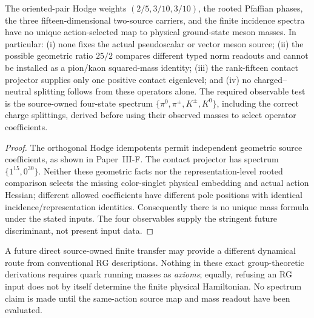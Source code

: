\documentclass[12pt,a4paper]{article}
\begin{document}
\begin{proposition}
\label{p11:prop:v338-native-meson-no-mass-prediction}
The oriented-pair Hodge weights $(2/5,3/10,3/10)$, the rooted
Pfaffian phases, the three fifteen-dimensional two-source carriers,
and the finite incidence spectra have no unique action-selected
map to physical ground-state meson masses.  In particular:
(i) none fixes the actual pseudoscalar or vector meson source;
(ii) the possible geometric ratio $25/2$ compares different typed
norm readouts and cannot be installed as a pion/kaon squared-mass
identity; (iii) the rank-fifteen contact projector supplies only
one positive contact eigenlevel; and (iv) no charged--neutral
splitting follows from these operators alone.
The required observable test is the source-owned four-state spectrum
$\{\pi^0,\pi^{\pm},K^{\pm},K^0\}$, including the correct charge
splittings, derived before using their observed masses to select
operator coefficients.
\end{proposition}
\begin{proof}
The orthogonal Hodge idempotents permit independent geometric
source coefficients, as shown in Paper~III-F.  The contact
projector has spectrum $\{1^{15},0^{30}\}$.
Neither these geometric facts nor the representation-level rooted
comparison selects the missing color-singlet physical embedding
and actual action Hessian; different allowed coefficients have
different pole positions with identical incidence/representation
identities.  Consequently there is no unique mass formula under
the stated inputs.  The four observables supply the stringent
future discriminant, not present input data.
\end{proof}
\begin{remark}
A future direct source-owned finite transfer may provide a
different dynamical route from conventional RG descriptions.
Nothing in these exact group-theoretic derivations requires quark
running masses as \emph{axioms}; equally, refusing an RG input does not
by itself determine the finite physical Hamiltonian.  No spectrum
claim is made until the same-action source map and mass readout
have been evaluated.
\end{remark}




\end{document}
